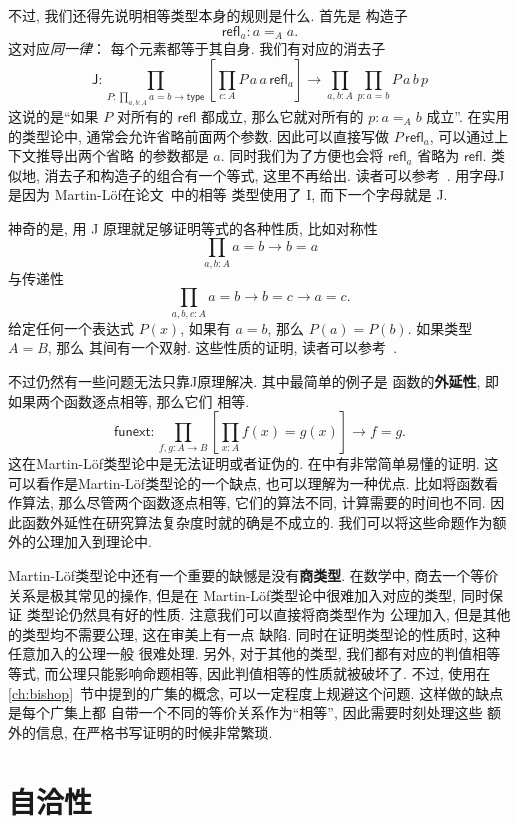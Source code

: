 \documentclass[UTF8]{ctexbook}
\newcommand{\cons}[1]{\textsf{#1}}
\theoremstyle{plain}
\theoremstyle{definition}
\theoremstyle{remark}
\begin{document}
不过, 我们还得先说明相等类型本身的规则是什么. 首先是
构造子
\[\cons{refl}_a : a =_A a.\]
这对应\emph{同一律}： 每个元素都等于其自身.
我们有对应的消去子
\[\cons{J} :
\prod_{P : \prod_{a,b:A} a = b \to \cons{type}}
\left[\prod_{c : A} P\,a\,a\,\cons{refl}_a\right] \to \prod_{a,b:A}\prod_{p : a=b} P\,a\,b\,p\]
这说的是“如果 \(P\) 对所有的 \(\cons{refl}\) 都成立,
那么它就对所有的 \(p : a=_A b\) 成立”.
在实用的类型论中, 通常会允许省略前面两个参数. 因此可以直接写做
\(P\,\cons{refl}_a\), 可以通过上下文推导出两个省略
的参数都是 \(a\). 同时我们为了方便也会将
\(\cons{refl}_a\) 省略为 \(\cons{refl}\).
类似地, 消去子和构造子的组合有一个等式, 这里不再给出.
读者可以参考~\cite{ufp:2013:hottbook}. 用字母J是因为
Martin-L\"of在论文~\cite{martinlof:1984:J}中的相等
类型使用了 I, 而下一个字母就是 J.

神奇的是, 用 J 原理就足够证明等式的各种性质, 比如对称性
\[\prod_{a,b:A} a = b \to b = a\]
与传递性
\[\prod_{a,b,c:A} a=b \to b=c \to a=c.\]
给定任何一个表达式 \(P(x)\), 如果有 \(a=b\),
那么 \(P(a) = P(b)\). 如果类型 \(A = B\), 那么
其间有一个双射. 这些性质的证明, 读者可以参考~\cite[\S1.12]{ufp:2013:hottbook}.

不过仍然有一些问题无法只靠J原理解决. 其中最简单的例子是
函数的\textbf{外延性}, 即如果两个函数逐点相等, 那么它们
相等.
\[\cons{funext} : \prod_{f,g : A \to B}
\left[\prod_{x : A} f(x) = g(x)\right] \to f = g.\]
这在Martin-L\"of类型论中是无法证明或者证伪的.
在\cite{boulier:2017:syntacticmodel}中有非常简单易懂的证明.
这可以看作是Martin-L\"of类型论的一个缺点, 也可以理解为一种优点.
比如将函数看作算法, 那么尽管两个函数逐点相等, 它们的算法不同,
计算需要的时间也不同. 因此函数外延性在研究算法复杂度时就的确是不成立的.
我们可以将这些命题作为额外的公理加入到理论中.

Martin-L\"of类型论中还有一个重要的缺憾是没有\textbf{商类型}.
在数学中, 商去一个等价关系是极其常见的操作, 但是在
Martin-L\"of类型论中很难加入对应的类型, 同时保证
类型论仍然具有好的性质. 注意我们可以直接将商类型作为
公理加入, 但是其他的类型均不需要公理, 这在审美上有一点
缺陷. 同时在证明类型论的性质时, 这种任意加入的公理一般
很难处理. 另外, 对于其他的类型, 我们都有对应的判值相等等式,
而公理只能影响命题相等, 因此判值相等的性质就被破坏了.
不过, 使用在 \ref{ch:bishop}~节中提到的广集的概念,
可以一定程度上规避这个问题. 这样做的缺点是每个广集上都
自带一个不同的等价关系作为“相等”, 因此需要时刻处理这些
额外的信息, 在严格书写证明的时候非常繁琐.

\section{自洽性}
\end{document}
